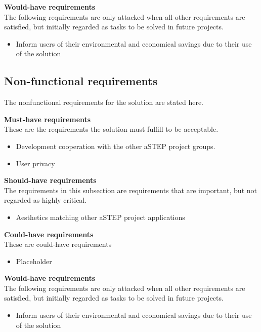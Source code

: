 \textbf{Would-have requirements}\\
The following requirements are only attacked when all other requirements are satisfied, but initially regarded as tasks to be solved in future projects.
\begin{itemize}
	\item Inform users of their environmental and economical savings due to their use of the solution
\end{itemize}

\subsection{Non-functional requirements}
The nonfunctional requirements for the solution are stated here.

\textbf{Must-have requirements}\\
These are the requirements the solution must fulfill to be acceptable.
\begin{itemize}
	\item Development cooperation with the other aSTEP project groups.
	\item User privacy
\end{itemize}

\textbf{Should-have requirements}\\
The requirements in this subsection are requirements that are important, but not regarded as highly critical.
\begin{itemize}
	\item Aesthetics matching other aSTEP project applications
\end{itemize}

\textbf{Could-have requirements}\\
These are could-have requirements
\begin{itemize}
	\item Placeholder
\end{itemize}

\textbf{Would-have requirements}\\
The following requirements are only attacked when all other requirements are satisfied, but initially regarded as tasks to be solved in future projects.
\begin{itemize}
	\item Inform users of their environmental and economical savings due to their use of the solution
\end{itemize}
